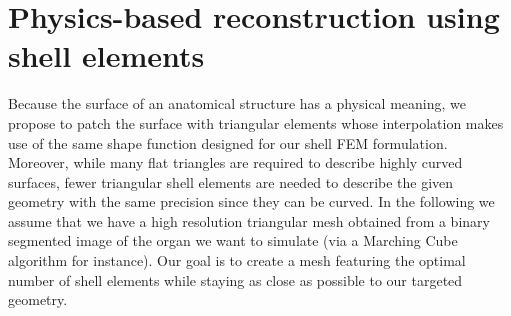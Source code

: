 \documentclass{llncs}
\begin{document}
\section{Physics-based reconstruction using shell elements}
\label{sec:mesh}


Because the surface of an anatomical structure has a physical meaning, we propose to patch the surface with triangular elements whose interpolation makes use of the same shape function designed for our shell FEM formulation. 
Moreover, while many flat triangles are required to describe highly curved surfaces, fewer triangular shell elements are needed to describe the given geometry with the same precision since they can be curved. In the following we assume that we have a high resolution triangular mesh obtained from a binary segmented image of the organ we want to simulate (via a Marching Cube algorithm for instance). Our goal is to create a mesh featuring the optimal number of shell elements while staying as close as possible to our targeted geometry. 
\end{document}

